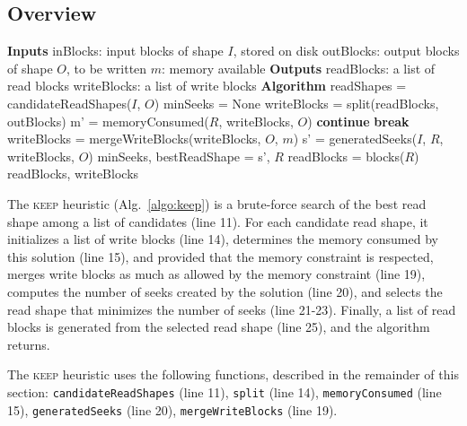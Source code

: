 \documentclass[sigconf, nonacm]{acmart}
\newcommand{\tristan}[1]{\color{orange}\textbf{From Tristan:}#1\color{black}}
\newcommand{\keep}[0]{\textsc{keep}\xspace}
\begin{document}
\subsection{Overview}

\begin{algorithm}
  \caption{\keep heuristic (implements \texttt{getReadWriteBlocks}) \tristan{verify all line numbers in the text, they have changed}}
  \label{algo:keep}
  \begin{algorithmic}[1]
    \STATE \textbf{Inputs}
    \STATE inBlocks: input blocks of shape $I$, stored on disk
    \STATE outBlocks: output blocks of shape $O$, to be written
    \STATE $m$: memory available
    \STATE
    \STATE \textbf{Outputs}
    \STATE readBlocks: a list of read blocks
    \STATE writeBlocks: a list of write blocks
    \STATE
    \STATE \textbf{Algorithm}
    \STATE readShapes = candidateReadShapes($I$, $O$)
    \STATE minSeeks = None
      \STATE writeBlocks = split(readBlocks, outBlocks)
      \STATE m' = memoryConsumed($R$, writeBlocks, $O$)
      \STATE \textbf{continue} 
      \ENDIF
      \STATE \textbf{break} 
      \ENDIF
      \STATE writeBlocks = mergeWriteBlocks(writeBlocks, $O$, $m$)
      \STATE s' = generatedSeeks($I$, $R$, writeBlocks, $O$)
      \STATE minSeeks, bestReadShape = s', $R$
      \ENDIF
    \ENDFOR
    \STATE readBlocks = blocks($R$)
    \RETURN readBlocks, writeBlocks
  \end{algorithmic}
\end{algorithm}
The \keep heuristic (Alg.~\ref{algo:keep}) is a brute-force search
of the best read shape among a list of candidates (line 11).  
For each candidate read shape, it initializes a list of write blocks (line
14), determines the memory consumed by this solution (line 15), and provided that the
memory constraint is respected, merges write blocks as much as allowed by the memory 
constraint (line 19), computes 
the number of seeks created by the solution (line
20), and selects the read shape that minimizes the number of seeks (line
21-23). Finally, a list of read blocks is generated from the  selected read shape (line
25), and the algorithm returns.

The \keep heuristic uses the following functions, described in the
remainder of this section: \texttt{candidateReadShapes} (line 11),
\texttt{split} (line 14), \texttt{memoryConsumed} (line 15),
\texttt{generatedSeeks} (line 20), \texttt{mergeWriteBlocks} (line 19).
\end{document}
